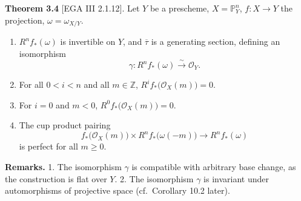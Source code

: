 \textbf{Theorem 3.4} [EGA III 2.1.12].
Let $Y$ be a prescheme, $X=\mathbb{P}^n_Y$, $f\colon X\to Y$ the projection, $\omega=\omega_{X/Y}$.
\begin{enumerate}
\item $R^n f_*(\omega)$ is invertible on $Y$, and $\overline{\tau}$ is a generating section, defining an isomorphism
\[
\gamma\colon R^n f_*(\omega) \xrightarrow{\sim} \mathcal{O}_Y.
\]
\item For all $0<i<n$ and all $m\in\mathbb{Z}$, $R^i f_*\big(\mathcal{O}_X(m)\big)=0$.
\item For $i=0$ and $m<0$, $R^0 f_*\big(\mathcal{O}_X(m)\big)=0$.
\item The cup product pairing
\[
f_*\big(\mathcal{O}_X(m)\big) \times R^n f_*\big(\omega(-m)\big)
\to R^n f_*(\omega)
\]
is perfect for all $m\ge 0$.
\end{enumerate}

\setcounter{page}{153}
\textbf{Remarks.}
1. The isomorphism $\gamma$ is compatible with arbitrary base change, as the construction is flat over $Y$.
2. The isomorphism $\gamma$ is invariant under automorphisms of projective space (cf.\ Corollary 10.2 later).
